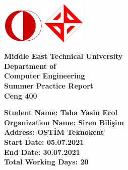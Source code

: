 \documentclass{scrreprt}
\begin{document}
\includegraphics[width=2cm]{metu.png}
\hfill
\includegraphics[width=2cm]{ceng.png}

\begin{center}
    {\bfseries
        \Huge{Middle East Technical University}\\
        Department of \\ Computer Engineering\\
        \vspace{1.6cm}
        Summer Practice Report\\
        Ceng 400\\
        \vspace{3.6cm}
    }
\end{center}

\begin{flushleft}
    {\bfseries
        \large{Student Name: Taha Yasin Erol}\\
        \vspace{0.25cm}
        Organization Name: Siren Bilişim\\
        \vspace{0.25cm}
        Address: OSTİM Teknokent\\
        \vspace{0.25cm}
        Start Date: 05.07.2021\\
        \vspace{0.25cm}
        End Date: 30.07.2021\\
        \vspace{0.25cm}
        Total Working Days: 20\\
    }
\end{flushleft}

\tableofcontents







\end{document}
